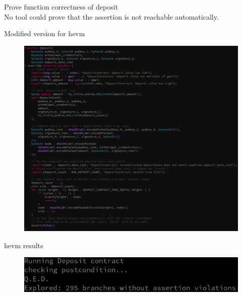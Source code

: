 \documentclass[aspectratio=169,10pt]{beamer}
\begin{document}
\begin{frame}[fragile]
\begin{center}
Prove function correctness of deposit\\
No tool could prove that the assertion is not reachable automatically.\\
\end{center}
\end{frame}

\begin{frame}[fragile]
\begin{center}
Modified version for hevm
\begin{figure}
\includegraphics[scale=0.25]{images/deposit_hevm_code}
\end{figure}
\end{center}
\end{frame}

\begin{frame}[fragile]
\begin{center}
hevm results
\begin{figure}
	\includegraphics[scale=0.35]{images/deposit_hevm_run}
\end{figure}
\end{center}
\end{frame}
\end{document}
